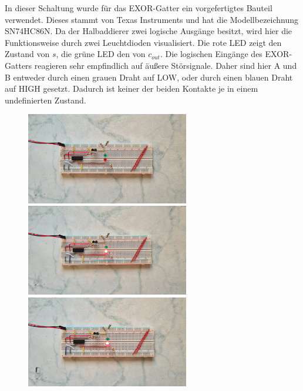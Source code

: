 In dieser Schaltung wurde für das EXOR-Gatter ein vorgefertigtes Bauteil verwendet. Dieses stammt von Texas Instruments und hat die Modellbezeichnung SN74HC86N. Da der Halbaddierer zwei logische Ausgänge besitzt, wird hier die Funktionsweise durch zwei Leuchtdioden visualisiert. Die rote LED zeigt den Zustand von $s$, die grüne LED den von $c_{out}$. Die logischen Eingänge des EXOR-Gatters reagieren sehr empfindlich auf äußere Störsignale. Daher sind hier A und B entweder durch einen grauen Draht auf LOW, oder durch einen blauen Draht auf HIGH gesetzt. Dadurch ist keiner der beiden Kontakte je in einem undefinierten Zustand.\\
\begin{figure}[h!]
	\begin{minipage}{.5\textwidth}
		\centering
		\includegraphics[height=4cm, keepaspectratio]{./Fotos/HA-00.jpg}
		\vspace{1cm}
	\end{minipage}%
	\begin{minipage}{.5\textwidth}
		\centering
		\includegraphics[height=4cm, keepaspectratio]{./Fotos/HA-01.jpg}
		\vspace{1cm}
	\end{minipage}
	\begin{minipage}{.5\textwidth}
		\centering
		\includegraphics[height=4cm, keepaspectratio]{./Fotos/HA-10.jpg}

\end{minipage}
\end{figure}

